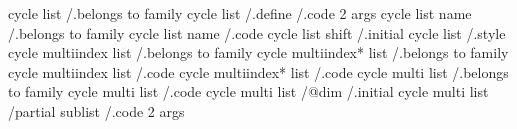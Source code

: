cycle list                               /.belongs to family
cycle list                               /.define           /.code 2 args
cycle list name                          /.belongs to family
cycle list name                          /.code             
cycle list shift                         /.initial          
cycle list                               /.style            
cycle multiindex list                    /.belongs to family
cycle multiindex* list                   /.belongs to family
cycle multiindex list                    /.code             
cycle multiindex* list                   /.code             
cycle multi list                         /.belongs to family
cycle multi list                         /.code             
cycle multi list      /@dim              /.initial
cycle multi list      /partial sublist   /.code 2 args

